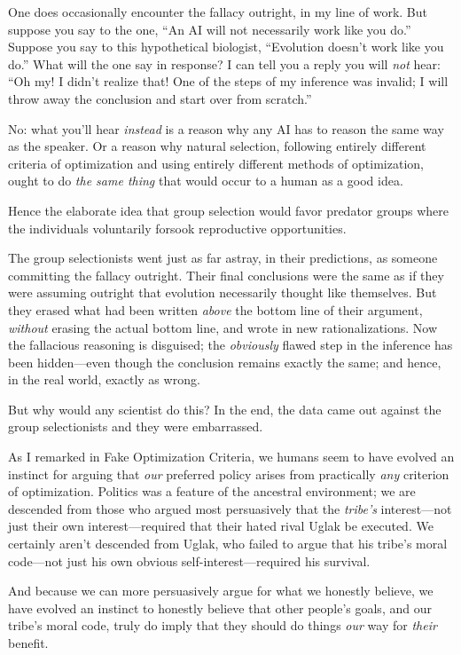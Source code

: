 { One does occasionally encounter the fallacy outright, in my line
of work. But suppose you say to the one, ``An AI will
not necessarily work like you do.'' Suppose you say
to this hypothetical biologist, ``Evolution
doesn't work like you do.'' What will
the one say in response? I can tell you a reply you will \textit{not}
hear: ``Oh my! I didn't realize that!
One of the steps of my inference was invalid; I will throw away the
conclusion and start over from scratch.''


 No: what you'll hear \textit{instead} is a reason
why any AI has to reason the same way as the speaker. Or a reason why
natural selection, following entirely different criteria of
optimization and using entirely different methods of optimization,
ought to do \textit{the same thing} that would occur to a human as a
good idea.


 Hence the elaborate idea that group selection would favor predator
groups where the individuals voluntarily forsook reproductive
opportunities.


 The group selectionists went just as far astray, in their
predictions, as someone committing the fallacy outright. Their final
conclusions were the same as if they were assuming outright that
evolution necessarily thought like themselves. But they erased what had
been written \textit{above} the bottom line of their argument,
\textit{without} erasing the actual bottom line, and wrote in new
rationalizations. Now the fallacious reasoning is disguised; the
\textit{obviously} flawed step in the inference has been hidden---even
though the conclusion remains exactly the same; and hence, in the real
world, exactly as wrong.


 But why would any scientist do this? In the end, the data came out
against the group selectionists and they were embarrassed.


 As I remarked in Fake Optimization Criteria, we humans seem to
have evolved an instinct for arguing that \textit{our} preferred policy
arises from practically \textit{any} criterion of optimization.
Politics was a feature of the ancestral environment; we are descended
from those who argued most persuasively that the
\textit{tribe's} interest---not just their own
interest---required that their hated rival Uglak be executed. We
certainly aren't descended from Uglak, who failed to
argue that his tribe's moral code{}---not just his own
obvious self-interest---required his survival.


 And because we can more persuasively argue for what we honestly
believe, we have evolved an instinct to honestly believe that other
people's goals, and our tribe's moral
code, truly do imply that they should do things \textit{our} way for
\textit{their} benefit.


}
